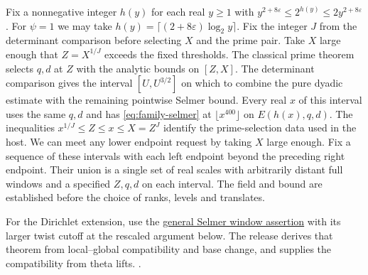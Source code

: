 %
Fix a nonnegative integer \(h(y)\) for each real \(y\ge1\) with
\(y^{2+8\varepsilon}\le 2^{h(y)}\le2y^{2+8\varepsilon}\).
For \(\psi=1\) we may take
\(h(y)=\lceil(2+8\varepsilon)\log_2 y\rceil\).
Fix the integer \(J\) from the determinant comparison before selecting
\(X\) and the prime pair. Take \(X\) large enough that \(Z=X^{1/J}\)
exceeds the fixed thresholds. The classical prime theorem selects
\(q,d\) at \(Z\) with the analytic bounds on \([Z,X]\). The determinant
comparison gives the interval \([U,U^{3/2}]\) on which to combine
the pure dyadic estimate with the remaining pointwise Selmer bound.
Every real \(x\) of this interval uses the same \(q,d\) and has
\eqref{eq:family-selmer} at \(\lfloor x^{400}\rfloor\) on
\(E(h(x),q,d)\). The inequalities
\(x^{1/J}\le Z\le x\le X=Z^J\) identify the prime-selection data
used in the host. We can meet any lower endpoint request by
taking \(X\) large enough. Fix a sequence of these intervals with
each left endpoint beyond the preceding right endpoint. Their union
is a single set of real scales with arbitrarily distant full windows
and a specified \(Z,q,d\) on each interval. The field and bound are
established before the choice of ranks, levels and translates.

For the Dirichlet extension, use the
\hyperlink{candidate.family}{general Selmer window assertion}
with its larger twist cutoff at the rescaled argument below. The
release derives that theorem from local--global compatibility and
base change, and supplies the compatibility from theta lifts.
.

